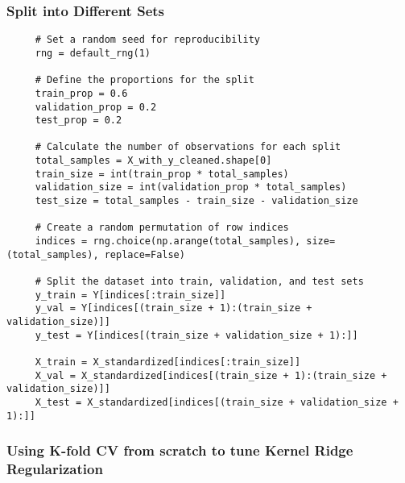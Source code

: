 \documentclass[letterpaper]{article}
\begin{document}
  \subsubsection{Split into Different Sets}
  \begin{lstlisting}
     # Set a random seed for reproducibility
     rng = default_rng(1)
     
     # Define the proportions for the split
     train_prop = 0.6
     validation_prop = 0.2
     test_prop = 0.2
     
     # Calculate the number of observations for each split
     total_samples = X_with_y_cleaned.shape[0]
     train_size = int(train_prop * total_samples)
     validation_size = int(validation_prop * total_samples)
     test_size = total_samples - train_size - validation_size
     
     # Create a random permutation of row indices
     indices = rng.choice(np.arange(total_samples), size=(total_samples), replace=False)
     
     # Split the dataset into train, validation, and test sets
     y_train = Y[indices[:train_size]]
     y_val = Y[indices[(train_size + 1):(train_size + validation_size)]]
     y_test = Y[indices[(train_size + validation_size + 1):]]
     
     X_train = X_standardized[indices[:train_size]]
     X_val = X_standardized[indices[(train_size + 1):(train_size + validation_size)]]
     X_test = X_standardized[indices[(train_size + validation_size + 1):]]
  \end{lstlisting}

\subsubsection{Using K-fold CV from scratch to tune Kernel Ridge Regularization}
\end{document}
